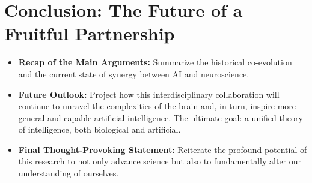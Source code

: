 \documentclass[11pt,a4paper]{article}
\begin{document}
\section{Conclusion: The Future of a Fruitful Partnership}
\begin{itemize}
    \item \textbf{Recap of the Main Arguments:} Summarize the historical co-evolution and the current state of synergy between AI and neuroscience.
    \item \textbf{Future Outlook:} Project how this interdisciplinary collaboration will continue to unravel the complexities of the brain and, in turn, inspire more general and capable artificial intelligence. The ultimate goal: a unified theory of intelligence, both biological and artificial.
    \item \textbf{Final Thought-Provoking Statement:} Reiterate the profound potential of this research to not only advance science but also to fundamentally alter our understanding of ourselves.
\end{itemize}

\clearpage
\nocite{*}
\printbibliography%
\end{document}
